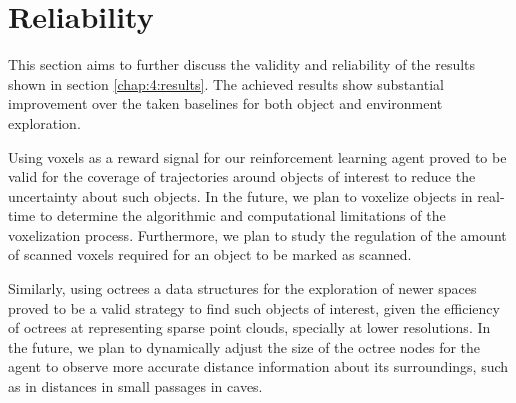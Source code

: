 \newpage

\section{Reliability}\label{sec:results-reliability}
    This section aims to further discuss the validity and reliability of the results shown in section \ref{chap:4:results}.
    The achieved results show substantial improvement over the taken baselines for both object and environment exploration. 

    Using voxels as a reward signal for our reinforcement learning agent proved to be valid for the coverage of trajectories around objects of interest to reduce the uncertainty about such objects.
    In the future, we plan to voxelize objects in real-time to determine the algorithmic and computational limitations of the voxelization process. Furthermore, we plan to study the regulation of the amount of scanned voxels required for an object to be marked as scanned.
   
    Similarly, using octrees a data structures for the exploration of newer spaces proved to be a valid strategy to find such objects of interest, given the efficiency of octrees at representing sparse point clouds, specially at lower resolutions.
    In the future, we plan to dynamically adjust the size of the octree nodes for the agent to observe more accurate distance information about its surroundings, such as in distances in small passages in caves.
    
